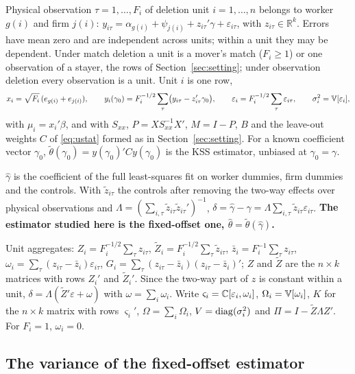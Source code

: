 Physical observation $\tau=1,\dots,F_i$ of deletion unit $i=1,\dots,n$ belongs to worker $g(i)$ and firm $j(i)$:
$y_{i\tau}=\alpha_{g(i)}+\psi_{j(i)}+z_{i\tau}'\gamma+\varepsilon_{i\tau}$, with $z_{i\tau}\in\mathbb{R}^k$. Errors have
mean zero and are independent across units; within a unit they may be dependent. Under match deletion a unit is a
mover's match ($F_i\ge1$) or one observation of a stayer, the rows of Section~\ref{sec:setting}; under observation
deletion every observation is a unit. Unit $i$ is one row,
\[
 x_i=\sqrt{F_i}\,(e_{g(i)}+e_{j(i)}),\qquad y_i(\gamma_0)=F_i^{-1/2}\sum_\tau\bigl(y_{i\tau}-z_{i\tau}'\gamma_0\bigr),\qquad
 \varepsilon_i=F_i^{-1/2}\sum_\tau\varepsilon_{i\tau},\qquad \sigma_i^2=\mathbb{V}[\varepsilon_i],
\]
with $\mu_i=x_i'\beta$, and with $S_{xx}$, $P=XS_{xx}^{-1}X'$, $M=I-P$, $B$ and the leave-out weights $C$ of
\eqref{eq:ustat} formed as in Section~\ref{sec:setting}. For a known coefficient vector $\gamma_0$,
$\tilde\theta(\gamma_0)=y(\gamma_0)'Cy(\gamma_0)$ is the KSS estimator, unbiased at $\gamma_0=\gamma$.

$\hat\gamma$ is the coefficient of the full least-squares fit on worker dummies, firm dummies and the controls.
With $\tilde z_{i\tau}$ the controls after removing the two-way effects over physical observations and
$\Lambda=(\sum_{i,\tau}\tilde z_{i\tau}\tilde z_{i\tau}')^{-1}$, $\delta=\hat\gamma-\gamma=\Lambda\sum_{i,\tau}\tilde
z_{i\tau}\varepsilon_{i\tau}$. \textbf{The estimator studied here is the fixed-offset one,
$\hat\theta=\tilde\theta(\hat\gamma)$.}

Unit aggregates: $Z_i=F_i^{-1/2}\sum_\tau z_{i\tau}$, $\tilde Z_i=F_i^{-1/2}\sum_\tau\tilde z_{i\tau}$,
$\bar z_i=F_i^{-1}\sum_\tau z_{i\tau}$, $\omega_i=\sum_\tau(z_{i\tau}-\bar z_i)\varepsilon_{i\tau}$,
$G_i=\sum_\tau(z_{i\tau}-\bar z_i)(z_{i\tau}-\bar z_i)'$; $Z$ and $\tilde Z$ are the $n\times k$ matrices with rows
$Z_i'$ and $\tilde Z_i'$. Since the two-way part of $z$ is constant within a unit,
$\delta=\Lambda(\tilde Z'\varepsilon+\omega)$ with $\omega=\sum_i\omega_i$. Write $\varsigma_i=\mathbb{C}[\varepsilon_i,\omega_i]$,
$\Omega_i=\mathbb{V}[\omega_i]$, $K$ for the $n\times k$ matrix with rows $\varsigma_i'$, $\Omega=\sum_i\Omega_i$,
$V=\operatorname{diag}(\sigma_i^2)$ and $\Pi=I-\tilde Z\Lambda Z'$. For $F_i=1$, $\omega_i=0$.

\subsection{The variance of the fixed-offset estimator}\label{ctl:var}

